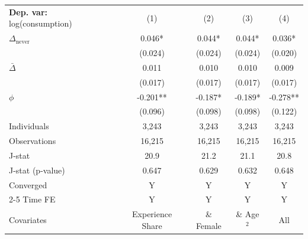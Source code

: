 \begin{tabular}{l cccc} \toprule  \textbf{Dep. var:}  log(consumption) 
                    &\multicolumn{1}{c}{(1)}   &\multicolumn{1}{c}{(2)}   &\multicolumn{1}{c}{(3)}   &\multicolumn{1}{c}{(4)}   \\

\addlinespace
$\Delta_{\text{never}}$&       0.046*  &       0.044*  &       0.044*  &       0.036*  \\
                    &     (0.024)   &     (0.024)   &     (0.024)   &     (0.020)   \\

\addlinespace
$\bar{\Delta}$      &       0.011   &       0.010   &       0.010   &       0.009   \\
                    &     (0.017)   &     (0.017)   &     (0.017)   &     (0.017)   \\

\addlinespace
$\phi$              &      -0.201** &      -0.187*  &      -0.189*  &      -0.278** \\
                    &     (0.096)   &     (0.098)   &     (0.098)   &     (0.122)   \\
\addlinespace
Individuals         &       3,243   &       3,243   &       3,243   &       3,243   \\
Observations        &      16,215   &      16,215   &      16,215   &      16,215   \\
J-stat              &        20.9   &        21.2   &        21.1   &        20.8   \\
J-stat (p-value)    &       0.647   &       0.629   &       0.632   &       0.648   \\
Converged           &           Y   &           Y   &           Y   &           Y   \\
\cmidrule{2-5} Time FE & Y & Y & Y & Y \\ Covariates & Experience Share & \& Female & \& Age$^2$ & All \\ \bottomrule \end{tabular}
